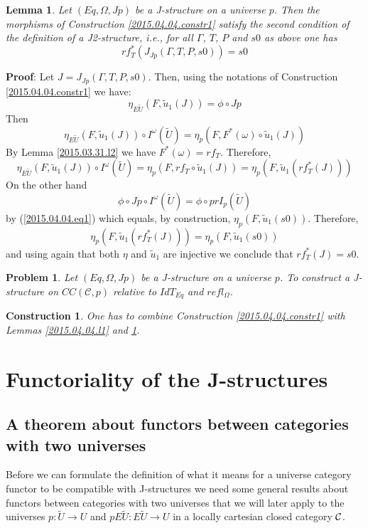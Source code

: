 \documentclass[12pt]{article}
\newenvironment{myproof}{{\bf Proof}:}{\vskip 5mm }
\newtheorem{lemma}[proposition]{Lemma}
\newtheorem{problem}[proposition]{Problem}
\newtheorem{construction}[proposition]{Construction}
\newcommand{\llabel}[1]{\label{#1}}
\newcommand{\sr}{\rightarrow}
\newcommand{\wt}{\widetilde}
\begin{document}
%
\begin{lemma}
\llabel{2015.04.04.l5}
Let $(Eq,\Omega,Jp)$ be a J-structure on a universe $p$. Then the morphisms of  Construction \ref{2015.04.04.constr1} satisfy the second condition of the definition of a J2-structure, i.e., for all $\Gamma$, $T$, $P$ and $s0$ as above one has
%
$$rf_T^*(J_{Jp}(\Gamma,T,P,s0))=s0$$
%
\end{lemma}
%
\begin{myproof}
Let $J=J_{Jp}(\Gamma,T,P,s0)$. Then, using the notations of Construction \ref{2015.04.04.constr1} we have:
%
$$\eta_{E\wt{U}}(F,\wt{u}_1(J))=\phi\circ Jp$$
%
Then
%
$$\eta_{E\wt{U}}(F,\wt{u}_1(J))\circ I^{\omega}(\wt{U})=\eta_p(F,F^*(\omega)\circ \wt{u}_1(J))$$
%
By Lemma \ref{2015.03.31.l2} we have $F^*(\omega)=rf_T$. Therefore,
%
$$\eta_{E\wt{U}}(F,\wt{u}_1(J))\circ I^{\omega}(\wt{U})=\eta_p(F,rf_T\circ \wt{u}_1(J))=\eta_p(F,\wt{u}_1(rf_T^*(J)))$$
%
On the other hand
%
$$\phi\circ Jp\circ I^{\omega}(\wt{U})=\phi\circ prI_p(\wt{U})$$
%
by (\ref{2015.04.04.eq1}) which equals, by construction, $\eta_p(F,\wt{u}_1(s0))$. Therefore,
%
$$\eta_p(F,\wt{u}_1(rf_T^*(J)))=\eta_p(F,\wt{u}_1(s0))$$
%
and using again that both $\eta$ and $\wt{u}_1$ are injective we conclude that $rf_T^*(J)=s0$. 
\end{myproof}
%
\begin{problem}
\llabel{2015.04.04.prob2}
Let $(Eq,\Omega,Jp)$ be a J-structure on a universe $p$. To construct a J-structure on $CC({\mathcal C},p)$ relative to $IdT_{Eq}$ and $refl_{\Omega}$.
\end{problem} 
%
\begin{construction}\rm
\llabel{2015.04.04.constr2}
One has to combine Construction \ref{2015.04.04.constr1} with Lemmas \ref{2015.04.04.l1} and \ref{2015.04.04.l5}.
\end{construction}
%





\section{Functoriality of the J-structures}




\subsection{A theorem about functors between categories with two universes}
\label{twouniv}
%
Before we can formulate the definition of what it means for a universe category functor to be compatible with J-structures we need some general results about functors between categories with two universes that we will later apply to the universes $p:\wt{U}\sr U$ and $pE\wt{U}:E\wt{U}\sr U$ in a locally cartesian closed category $\cal C$. 
\end{document}
